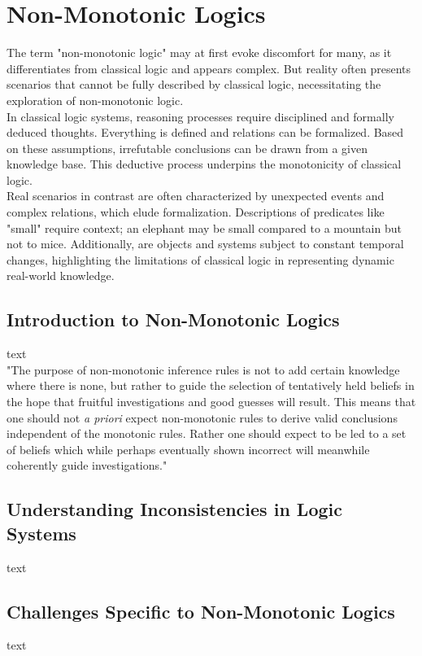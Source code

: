 \section{Non-Monotonic Logics}
The term "non-monotonic logic" may at first evoke discomfort for many, as it differentiates from classical logic and appears complex. But reality often presents scenarios that cannot be fully described by classical logic, necessitating the exploration of non-monotonic logic.\\
In classical logic systems, reasoning processes require disciplined and formally deduced thoughts. Everything is defined and relations can be formalized. Based on these assumptions, irrefutable conclusions can be drawn from a given knowledge base. This deductive process underpins the monotonicity of classical logic.\\
Real scenarios in contrast are often characterized by unexpected events and complex relations, which elude formalization. Descriptions of predicates like "small" require context; an elephant may be small compared to a mountain but not to mice. Additionally, are objects and systems subject to constant temporal changes, highlighting the limitations of classical logic in representing dynamic real-world knowledge.\\

\subsection{Introduction to Non-Monotonic Logics}
text\\
"The purpose of non-monotonic inference rules is not to add certain knowledge where there is none, but rather to guide the selection of tentatively held beliefs in the hope that fruitful investigations and good guesses will result. This means that one should not \textit{a priori} expect non-monotonic rules to derive valid conclusions independent of the monotonic rules. Rather one should expect to be led to a set of beliefs which while perhaps eventually shown incorrect will meanwhile coherently guide investigations."\\
\cite[p. 46]{mcdermott_non-monotonic_1980}

\subsection{Understanding Inconsistencies in Logic Systems}
text

\subsection{Challenges Specific to Non-Monotonic Logics}
text

